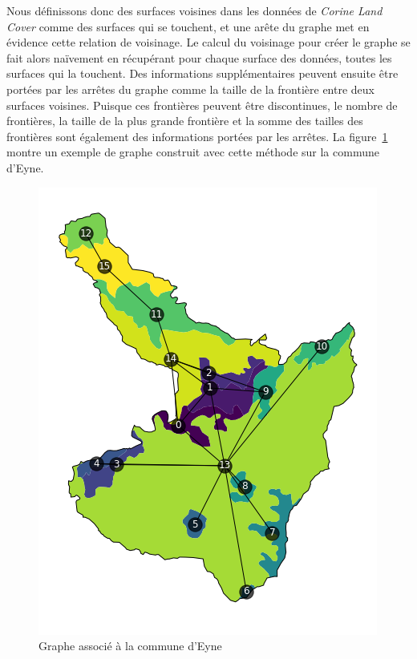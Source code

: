Nous définissons donc des surfaces voisines dans les données de \emph{Corine Land Cover} comme des surfaces qui se touchent, et une arête du graphe met en évidence cette relation de voisinage.
Le calcul du voisinage pour créer le graphe se fait alors naïvement en récupérant pour chaque surface des données, toutes les surfaces qui la touchent.
Des informations supplémentaires peuvent ensuite être portées par les arrêtes du graphe comme la taille de la frontière entre deux surfaces voisines.
Puisque ces frontières peuvent être discontinues, le nombre de frontières, la taille de la plus grande frontière et la somme des tailles des frontières sont également des informations portées par les arrêtes.
La figure~\ref{fig:eyne-map-graph} montre un exemple de graphe construit avec cette méthode sur la commune d'Eyne.


\begin{figure}[!h]
    \centering
    \includegraphics[scale=0.5]{figures/eyne-map-graph}
    \caption{Graphe associé à la commune d'Eyne}
    \label{fig:eyne-map-graph}
\end{figure}
